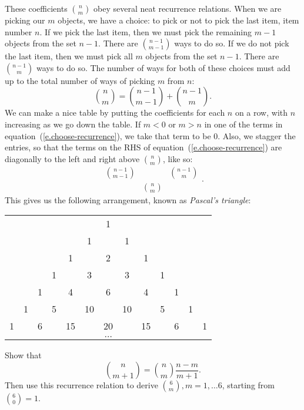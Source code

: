 These coefficients $n\choose m$ obey several neat recurrence relations. When we are picking our $m$ objects, we have a choice: to pick or not to pick the last item, item number $n$. If we pick the last item, then we must pick the remaining $m-1$ objects from the set $n-1$.  There are ${n-1\choose m-1}$ ways to do so.  If we do not pick the last item, then we must pick all $m$ objects from the set $n-1$. There are ${n-1\choose m}$ ways to do so.  The number of ways for both of these choices must add up to the total number of ways of picking $m$ from $n$:
\begin{equation}\label{e.choose-recurrence}
{n\choose m} = {n-1\choose m-1} + {n-1\choose m}.
\end{equation}
We can make a nice table by putting the coefficients for each $n$ on a row, with $n$ increasing as we go down the table. If $m<0$ or $m>n$ in one of the terms in equation~(\ref{e.choose-recurrence}), we take that term to be 0.  Also, we stagger the entries, so that the terms on the RHS of equation~(\ref{e.choose-recurrence}) are diagonally to the left and right above ${n\choose m}$, like so:
\[ \begin{array}{ccc}{n-1\choose m-1} &  & {n-1\choose m} \\ & {n\choose m} & \end{array}. \]
This gives us the following arrangement, known as \emph{Pascal's triangle}:
\begin{center}
\begin{tabular}{ccccccccccccc}
	&	&	&	&	&	& 1	&	&	&	&	&	&	\\
	&	&	&	&	& 1	& 	& 1	&	&	&	&	&	\\
	&	&	&	& 1	& 	& 2	& 	& 1	&	&	&	&	\\
 	&	&	& 1	& 	& 3	&	& 3	&	& 1	&	&	&	\\
	&	& 1	&	& 4	&	& 6	&	& 4	& 	& 1	&	&	\\
	& 1	&	& 5	&	& 10&	&10	&	& 5	&	& 1	&	\\
1	&	& 6	&	& 15&	&20	&	&15	&	& 6	&	& 1	\\			
	&	&	&	&	&	&$\ldots$&	&	&	&	& &	\\
\end{tabular}
\end{center}

\begin{exercisebox}
Show that
\[ {n\choose m+1} = {n\choose m} \frac{n-m}{m+1}. \]
Then use this recurrence relation to derive ${6\choose m}, m=1,\ldots 6$, starting from ${6\choose 0} = 1$.
\end{exercisebox}

